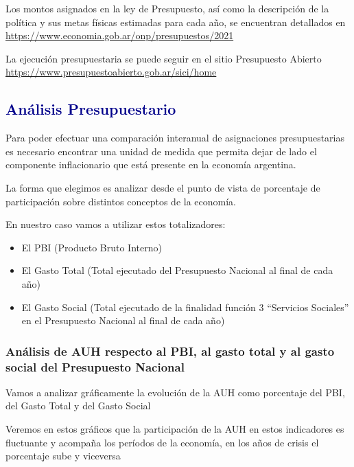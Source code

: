\documentclass[
  12,
]{article}
\begin{document}
Los montos asignados en la ley de Presupuesto, así como la descripción
de la política y sus metas físicas estimadas para cada año, se
encuentran detallados en
\url{https://www.economia.gob.ar/onp/presupuestos/2021}

La ejecución presupuestaria se puede seguir en el sitio Presupuesto
Abierto \url{https://www.presupuestoabierto.gob.ar/sici/home}

\hypertarget{anuxe1lisis-presupuestario}{%
\subsection{\texorpdfstring{\textcolor{darkblue}{Análisis
Presupuestario}}{Análisis Presupuestario}}\label{anuxe1lisis-presupuestario}}

Para poder efectuar una comparación interanual de asignaciones
presupuestarias es necesario encontrar una unidad de medida que permita
dejar de lado el componente inflacionario que está presente en la
economía argentina.

La forma que elegimos es analizar desde el punto de vista de porcentaje
de participación sobre distintos conceptos de la economía.

En nuestro caso vamos a utilizar estos totalizadores:

\begin{itemize}
\item
  El PBI (Producto Bruto Interno)
\item
  El Gasto Total (Total ejecutado del Presupuesto Nacional al final de
  cada año)
\item
  El Gasto Social (Total ejecutado de la finalidad función 3 ``Servicios
  Sociales'' en el Presupuesto Nacional al final de cada año)
\end{itemize}

\hypertarget{anuxe1lisis-de-auh-respecto-al-pbi-al-gasto-total-y-al-gasto-social-del-presupuesto-nacional}{%
\subsubsection{Análisis de AUH respecto al PBI, al gasto total y al
gasto social del Presupuesto
Nacional}\label{anuxe1lisis-de-auh-respecto-al-pbi-al-gasto-total-y-al-gasto-social-del-presupuesto-nacional}}

Vamos a analizar gráficamente la evolución de la AUH como porcentaje del
PBI, del Gasto Total y del Gasto Social

Veremos en estos gráficos que la participación de la AUH en estos
indicadores es fluctuante y acompaña los períodos de la economía, en los
años de crisis el porcentaje sube y viceversa
\end{document}
